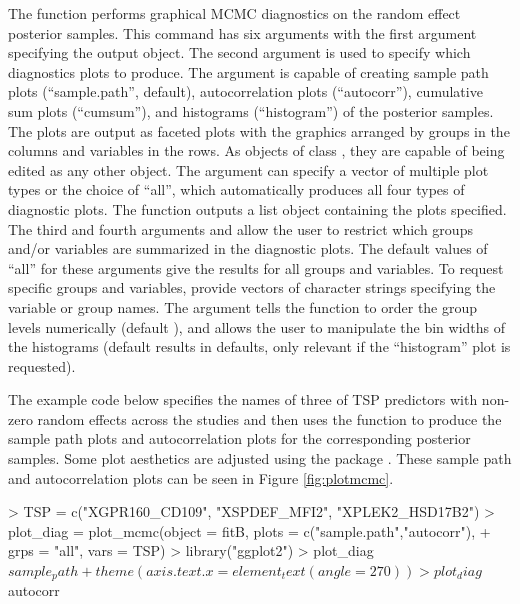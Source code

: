 The  function performs graphical MCMC diagnostics on
the random effect posterior samples. 
This command has six arguments with
the first argument specifying the  output object. The
second argument  is used to specify which diagnostics
plots to produce. The  argument is capable of
creating sample path plots (``sample.path'', default), autocorrelation plots
(``autocorr''), cumulative sum plots (``cumsum''), and histograms
(``histogram'') of the posterior samples. The plots are output as faceted
 \citep{ggplot2book} plots with the graphics arranged by groups in the columns and
variables in the rows. As objects of class , they are capable of being edited as any other  object. The  argument can specify a vector
of multiple plot types or the choice of ``all'', which
automatically produces all four types of diagnostic plots. The function
outputs a list object containing the plots specified. The third and fourth arguments
 and  allow the user to restrict which groups
and/or variables are summarized in the diagnostic plots. The default
values of ``all'' for these arguments give the results for all groups
and variables. To request specific groups and variables, provide vectors
of character strings specifying the variable or group names. The argument
 tells the function to order the group levels numerically (default ), and  allows the
user to manipulate the bin widths of the histograms (default
 results in  defaults, only relevant if the ``histogram'' plot is requested).

The example code below specifies the names of three of TSP predictors with non-zero random effects across the studies and then uses the  function to produce the sample path plots and autocorrelation plots for the corresponding posterior samples. Some plot aesthetics are adjusted using the  package \citep{ggplot2book}. These sample path and autocorrelation plots can be seen in Figure \ref{fig:plotmcmc}.

\begin{example}
> TSP = c("XGPR160_CD109", "XSPDEF_MFI2", "XPLEK2_HSD17B2")
> plot_diag = plot_mcmc(object = fitB, plots = c("sample.path","autocorr"), 
+                       grps = "all", vars = TSP)
> library("ggplot2")
> plot_diag$sample_path + theme(axis.text.x = element_text(angle = 270))
> plot_diag$autocorr
\end{example}


